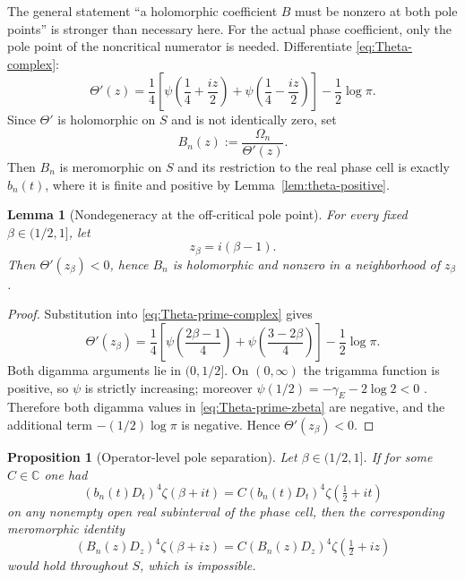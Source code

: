 \documentclass[11pt]{amsart}
\numberwithin{equation}{section}
\newtheorem{proposition}[theorem]{Proposition}
\newtheorem{lemma}[theorem]{Lemma}
\newcommand{\C}{\mathbb C}
\begin{document}
The general statement ``a holomorphic coefficient $B$ must be nonzero at both
pole points'' is stronger than necessary here.  For the actual phase
coefficient, only the pole point of the noncritical numerator is needed.
Differentiate \eqref{eq:Theta-complex}:
\begin{equation}
 \Theta'(z)=\frac14\left[
 \psi\!\left(\frac14+\frac{iz}{2}\right)
 +\psi\!\left(\frac14-\frac{iz}{2}\right)
 \right]-\frac12\log\pi.
 \label{eq:Theta-prime-complex}
\end{equation}
Since $\Theta'$ is holomorphic on $S$ and is not identically zero, set
\begin{equation}
 B_n(z):=\frac{\Omega_n}{\Theta'(z)}.
 \label{eq:Bn-holomorphic}
\end{equation}
Then $B_n$ is meromorphic on $S$ and its restriction to the real phase cell is
exactly $b_n(t)$, where it is finite and positive by
Lemma~\ref{lem:theta-positive}.

\begin{lemma}[Nondegeneracy at the off-critical pole point]
\label{lem:Bn-nondegenerate-zbeta}
For every fixed $\beta\in(1/2,1]$, let
\begin{equation}
 z_\beta=i(\beta-1).
 \label{eq:zbeta-operator}
\end{equation}
Then $\Theta'(z_\beta)<0$, hence $B_n$ is holomorphic and nonzero in a
neighborhood of $z_\beta$.
\end{lemma}

\begin{proof}
Substitution into \eqref{eq:Theta-prime-complex} gives
\begin{equation}
 \Theta'(z_\beta)=\frac14\left[
 \psi\!\left(\frac{2\beta-1}{4}\right)
 +\psi\!\left(\frac{3-2\beta}{4}\right)
 \right]-\frac12\log\pi.
 \label{eq:Theta-prime-zbeta}
\end{equation}
Both digamma arguments lie in $(0,1/2]$.  On $(0,\infty)$ the trigamma
function is positive, so $\psi$ is strictly increasing; moreover
$\psi(1/2)=-\gamma_E-2\log2<0$ \cite{DLMF}.  Therefore both digamma values
in \eqref{eq:Theta-prime-zbeta} are negative, and the additional term
$-(1/2)\log\pi$ is negative.  Hence $\Theta'(z_\beta)<0$.
\end{proof}

\begin{proposition}[Operator-level pole separation]
\label{prop:operator-pole-separation}
Let $\beta\in(1/2,1]$.  If for some $C\in\C$ one had
\begin{equation}
 (b_n(t)D_t)^4\zeta(\beta+it)
 =C(b_n(t)D_t)^4\zeta(\tfrac12+it)
 \label{eq:operator-real-proportionality}
\end{equation}
on any nonempty open real subinterval of the phase cell, then the corresponding
meromorphic identity
\begin{equation}
 (B_n(z)D_z)^4\zeta(\beta+iz)
 =C(B_n(z)D_z)^4\zeta(\tfrac12+iz)
 \label{eq:operator-meromorphic-proportionality}
\end{equation}
would hold throughout $S$, which is impossible.
\end{proposition}
\end{document}
